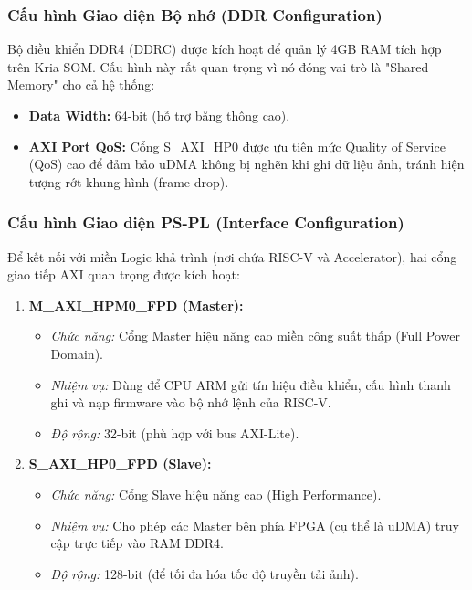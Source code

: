 \subsubsection{Cấu hình Giao diện Bộ nhớ (DDR Configuration)}
Bộ điều khiển DDR4 (DDRC) được kích hoạt để quản lý 4GB RAM tích hợp trên Kria SOM. Cấu hình này rất quan trọng vì nó đóng vai trò là "Shared Memory" cho cả hệ thống:
\begin{itemize}
    \item \textbf{Data Width:} 64-bit (hỗ trợ băng thông cao).
    \item \textbf{AXI Port QoS:} Cổng S\_AXI\_HP0 được ưu tiên mức Quality of Service (QoS) cao để đảm bảo uDMA không bị nghẽn khi ghi dữ liệu ảnh, tránh hiện tượng rớt khung hình (frame drop).
\end{itemize}

\subsubsection{Cấu hình Giao diện PS-PL (Interface Configuration)}
Để kết nối với miền Logic khả trình (nơi chứa RISC-V và Accelerator), hai cổng giao tiếp AXI quan trọng được kích hoạt:

\begin{enumerate}
    \item \textbf{M\_AXI\_HPM0\_FPD (Master):}
    \begin{itemize}
        \item \textit{Chức năng:} Cổng Master hiệu năng cao miền công suất thấp (Full Power Domain).
        \item \textit{Nhiệm vụ:} Dùng để CPU ARM gửi tín hiệu điều khiển, cấu hình thanh ghi và nạp firmware vào bộ nhớ lệnh của RISC-V.
        \item \textit{Độ rộng:} 32-bit (phù hợp với bus AXI-Lite).
    \end{itemize}
    
    \item \textbf{S\_AXI\_HP0\_FPD (Slave):}
    \begin{itemize}
        \item \textit{Chức năng:} Cổng Slave hiệu năng cao (High Performance).
        \item \textit{Nhiệm vụ:} Cho phép các Master bên phía FPGA (cụ thể là uDMA) truy cập trực tiếp vào RAM DDR4.
        \item \textit{Độ rộng:} 128-bit (để tối đa hóa tốc độ truyền tải ảnh).
    \end{itemize}
\end{enumerate}

